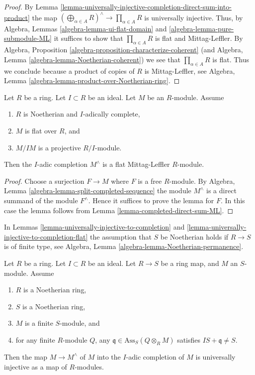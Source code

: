\begin{proof}
By
Lemma \ref{lemma-universally-injective-completion-direct-sum-into-product}
the map $\left(\bigoplus\nolimits_{\alpha \in A} R\right)^\wedge
\to \prod_{\alpha \in A} R$ is universally injective.
Thus, by
Algebra, Lemmas \ref{algebra-lemma-ui-flat-domain} and
\ref{algebra-lemma-pure-submodule-ML}
it suffices to show that $\prod_{\alpha \in A} R$ is flat and Mittag-Leffler.
By
Algebra, Proposition \ref{algebra-proposition-characterize-coherent}
(and
Algebra, Lemma \ref{algebra-lemma-Noetherian-coherent})
we see that $\prod_{\alpha \in A} R$ is flat.
Thus we conclude because a product of copies of $R$ is Mittag-Leffler, see
Algebra, Lemma \ref{algebra-lemma-product-over-Noetherian-ring}.
\end{proof}

\begin{lemma}
\label{lemma-lift-ML}
Let $R$ be a ring. Let $I \subset R$ be an ideal.
Let $M$ be an $R$-module.
Assume
\begin{enumerate}
\item $R$ is Noetherian and $I$-adically complete,
\item $M$ is flat over $R$, and
\item $M/IM$ is a projective $R/I$-module.
\end{enumerate}
Then the $I$-adic completion $M^\wedge$ is a flat Mittag-Leffler
$R$-module.
\end{lemma}

\begin{proof}
Choose a surjection $F \to M$ where $F$ is a free $R$-module. By
Algebra, Lemma \ref{algebra-lemma-split-completed-sequence}
the module $M^\wedge$ is a direct summand of the module $F^\wedge$.
Hence it suffices to prove the lemma for $F$.
In this case the lemma follows from
Lemma \ref{lemma-completed-direct-sum-ML}.
\end{proof}

\noindent
In
Lemmas \ref{lemma-universally-injective-to-completion} and
\ref{lemma-universally-injective-to-completion-flat}
the assumption that $S$ be Noetherian holds if $R \to S$ is of finite type, see
Algebra, Lemma \ref{algebra-lemma-Noetherian-permanence}.

\begin{lemma}
\label{lemma-universally-injective-to-completion}
Let $R$ be a ring.
Let $I \subset R$ be an ideal.
Let $R \to S$ be a ring map, and $M$ an $S$-module.
Assume
\begin{enumerate}
\item $R$ is a Noetherian ring,
\item $S$ is a Noetherian ring,
\item $M$ is a finite $S$-module, and
\item for any finite $R$-module $Q$, any
$\mathfrak q \in \text{Ass}_S(Q \otimes_R M)$
satisfies $IS + \mathfrak q \not = S$.
\end{enumerate}
Then the map $M \to M^\wedge$ of $M$ into the $I$-adic completion of $M$
is universally injective as a map of $R$-modules.
\end{lemma}

